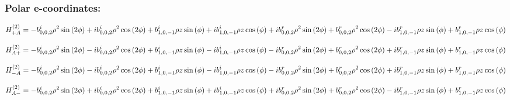 \documentclass[fleqn]{article}
\begin{document}
\subsubsection*{Polar e-coordinates:}

\begin{dmath*}
H_{+A}^{(2)}=- b^{i}_{0,0,2} \rho^{2} \sin{\left (2 \phi \right )} +  i b^{i}_{0,0,2} \rho^{2} \cos{\left (2 \phi \right )} + b^{i}_{1,0,-1} \rho z \sin{\left (\phi \right )} +  i b^{i}_{1,0,-1} \rho z \cos{\left (\phi \right )} +  i b^{r}_{0,0,2} \rho^{2} \sin{\left (2 \phi \right )} + b^{r}_{0,0,2} \rho^{2} \cos{\left (2 \phi \right )} -  i b^{r}_{1,0,-1} \rho z \sin{\left (\phi \right )} + b^{r}_{1,0,-1} \rho z \cos{\left (\phi \right )}\\
\end{dmath*}

\begin{dmath*}
H_{A+}^{(2)}=- b^{i}_{0,0,2} \rho^{2} \sin{\left (2 \phi \right )} -  i b^{i}_{0,0,2} \rho^{2} \cos{\left (2 \phi \right )} + b^{i}_{1,0,-1} \rho z \sin{\left (\phi \right )} -  i b^{i}_{1,0,-1} \rho z \cos{\left (\phi \right )} -  i b^{r}_{0,0,2} \rho^{2} \sin{\left (2 \phi \right )} + b^{r}_{0,0,2} \rho^{2} \cos{\left (2 \phi \right )} +  i b^{r}_{1,0,-1} \rho z \sin{\left (\phi \right )} + b^{r}_{1,0,-1} \rho z \cos{\left (\phi \right )}\\
\end{dmath*}

\begin{dmath*}
H_{-A}^{(2)}=- b^{i}_{0,0,2} \rho^{2} \sin{\left (2 \phi \right )} -  i b^{i}_{0,0,2} \rho^{2} \cos{\left (2 \phi \right )} + b^{i}_{1,0,-1} \rho z \sin{\left (\phi \right )} -  i b^{i}_{1,0,-1} \rho z \cos{\left (\phi \right )} -  i b^{r}_{0,0,2} \rho^{2} \sin{\left (2 \phi \right )} + b^{r}_{0,0,2} \rho^{2} \cos{\left (2 \phi \right )} +  i b^{r}_{1,0,-1} \rho z \sin{\left (\phi \right )} + b^{r}_{1,0,-1} \rho z \cos{\left (\phi \right )}\\
\end{dmath*}

\begin{dmath*}
H_{A-}^{(2)}=- b^{i}_{0,0,2} \rho^{2} \sin{\left (2 \phi \right )} +  i b^{i}_{0,0,2} \rho^{2} \cos{\left (2 \phi \right )} + b^{i}_{1,0,-1} \rho z \sin{\left (\phi \right )} +  i b^{i}_{1,0,-1} \rho z \cos{\left (\phi \right )} +  i b^{r}_{0,0,2} \rho^{2} \sin{\left (2 \phi \right )} + b^{r}_{0,0,2} \rho^{2} \cos{\left (2 \phi \right )} -  i b^{r}_{1,0,-1} \rho z \sin{\left (\phi \right )} + b^{r}_{1,0,-1} \rho z \cos{\left (\phi \right )}\\
\end{dmath*}
\end{document}
